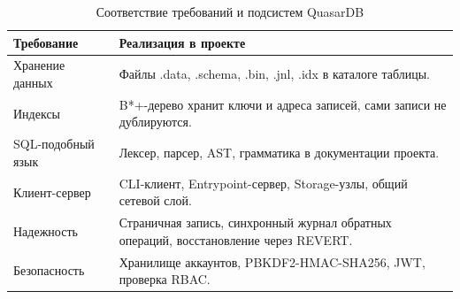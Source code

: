 \documentclass[a4paper,14pt]{extarticle}
\renewcommand{\texttt}[1]{\textrm{#1}}
\begin{document}
\begin{table}[H]
\caption{Соответствие требований и подсистем QuasarDB}
\centering
\small
\begin{tabularx}{\textwidth}{>{\raggedright\arraybackslash}p{}Y}
\toprule
Требование & Реализация в проекте \\
\midrule
Хранение данных & Файлы \texttt{.data}, \texttt{.schema}, \texttt{.bin}, \texttt{.jnl}, \texttt{.idx} в каталоге таблицы. \\
Индексы & B*+-дерево хранит ключи и адреса записей, сами записи не дублируются. \\
SQL-подобный язык & Лексер, парсер, AST, грамматика в документации проекта. \\
Клиент-сервер & CLI-клиент, Entrypoint-сервер, Storage-узлы, общий сетевой слой. \\
Надежность & Страничная запись, синхронный журнал обратных операций, восстановление через \texttt{REVERT}. \\
Безопасность & Хранилище аккаунтов, PBKDF2-HMAC-SHA256, JWT, проверка RBAC. \\
\bottomrule
\end{tabularx}
\end{table}
\end{document}
